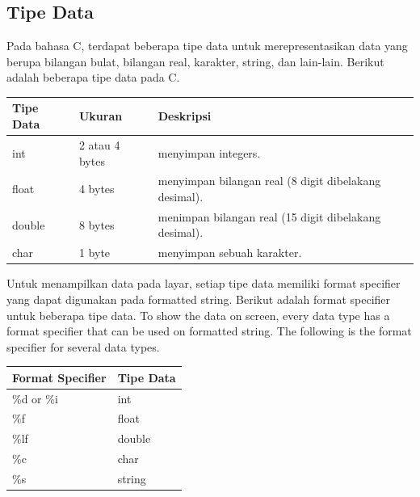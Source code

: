 \subsection{Tipe Data}
Pada bahasa C, terdapat beberapa tipe data untuk merepresentasikan data yang berupa bilangan bulat, bilangan real, karakter, string, dan lain-lain. Berikut adalah beberapa tipe data pada C.
\begin{center}
	\begin{tabular}{|l|l|l|}
		\hline
		Tipe Data & Ukuran       & Deskripsi                                         \\ \hline
		int       & 2 atau 4 bytes & menyimpan integers.                        \\ \hline
		float     & 4 bytes      & menyimpan bilangan real (8 digit dibelakang desimal). \\ \hline
		double    & 8 bytes      & menimpan bilangan real (15 digit dibelakang desimal). \\ \hline
		char      & 1 byte       & menyimpan sebuah karakter.                     \\ \hline
	\end{tabular}
\end{center}
Untuk menampilkan data pada layar, setiap tipe data memiliki format specifier yang dapat digunakan pada formatted string. Berikut adalah format specifier untuk beberapa tipe data.
To show the data on screen, every data type has a format specifier that can be used on formatted string. The following is the format specifier for several data types.
\begin{center}
	\begin{tabular}{|l|l|}
		\hline
		Format Specifier & Tipe Data   \\ \hline
		\%d or \%i       & int          \\ \hline
		\%f              & float        \\ \hline
		\%lf             & double       \\ \hline
		\%c              & char         \\ \hline
		\%s              & string \\ \hline
	\end{tabular}
\end{center}
